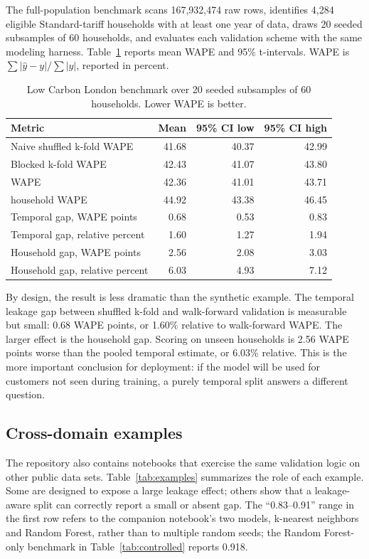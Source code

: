 \documentclass[11pt]{article}
\DeclareRobustCommand{\code}[1]{\texttt{\detokenize{#1}}}
\begin{document}
The full-population benchmark scans 167,932,474 raw rows, identifies 4,284
eligible Standard-tariff households with at least one year of data, draws 20
seeded subsamples of 60 households, and evaluates each validation scheme with
the same modeling harness. Table~\ref{tab:lcl} reports mean WAPE and 95\%
t-intervals. WAPE is $\sum |\hat{y}-y| / \sum |y|$, reported in percent.

\begin{table}[htbp]
\centering
\caption{Low Carbon London benchmark over 20 seeded subsamples of 60
households. Lower WAPE is better.}
\label{tab:lcl}
\begin{tabular}{lrrr}
\toprule
Metric & Mean & 95\% CI low & 95\% CI high \\
\midrule
Naive shuffled k-fold WAPE & 41.68 & 40.37 & 42.99 \\
Blocked k-fold WAPE & 42.43 & 41.07 & 43.80 \\
\code{WalkForwardSplit} WAPE & 42.36 & 41.01 & 43.71 \\
\code{GroupKFold} household WAPE & 44.92 & 43.38 & 46.45 \\
Temporal gap, WAPE points & 0.68 & 0.53 & 0.83 \\
Temporal gap, relative percent & 1.60 & 1.27 & 1.94 \\
Household gap, WAPE points & 2.56 & 2.08 & 3.03 \\
Household gap, relative percent & 6.03 & 4.93 & 7.12 \\
\bottomrule
\end{tabular}
\end{table}

By design, the result is less dramatic than the synthetic example. The temporal
leakage gap between shuffled k-fold and walk-forward validation is measurable
but small: 0.68 WAPE points, or 1.60\% relative to walk-forward WAPE. The
larger effect is the household gap. Scoring on unseen households is 2.56 WAPE
points worse than the pooled temporal estimate, or 6.03\% relative. This is the
more important conclusion for deployment: if the model will be used for
customers not seen during training, a purely temporal split answers a different
question.

\subsection{Cross-domain examples}

The repository also contains notebooks that exercise the same validation logic
on other public data sets. Table~\ref{tab:examples} summarizes the role of each
example. Some are designed to expose a large leakage effect; others show that a
leakage-aware split can correctly report a small or absent gap. The
``0.83--0.91'' range in the first row refers to the companion notebook's two
models, k-nearest neighbors and Random Forest, rather than to multiple random
seeds; the Random Forest-only benchmark in Table~\ref{tab:controlled} reports
0.918.
\end{document}
